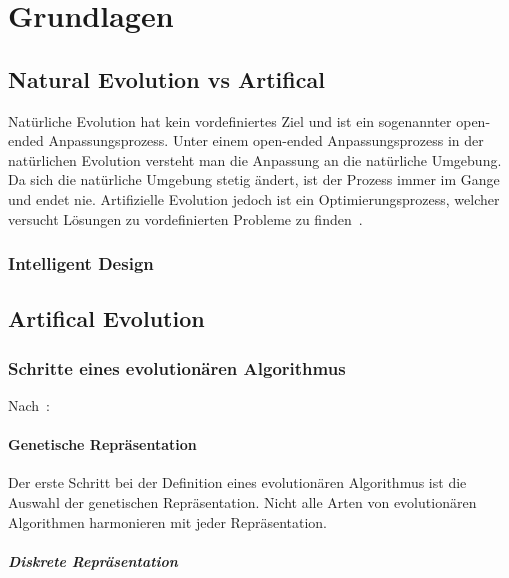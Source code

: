 %
%


\chapter{Grundlagen}

\section{Natural Evolution vs Artifical}

  Natürliche Evolution hat kein vordefiniertes Ziel und ist ein sogenannter open-ended Anpassungsprozess.
  Unter einem open-ended Anpassungsprozess in der natürlichen Evolution versteht man die Anpassung an die natürliche Umgebung.
  Da sich die natürliche Umgebung stetig ändert, ist der Prozess immer im Gange und endet nie.
  Artifizielle Evolution jedoch ist ein Optimierungsprozess,
  welcher versucht Lösungen zu vordefinierten Probleme zu finden~\cite[S.1]{book:bioInspired}.

  \subsection{Intelligent Design\label{sub:IntelligentDesign}}


\section{Artifical Evolution}

  \subsection{Schritte eines evolutionären Algorithmus\label{sub:stepsEvAlgo}}

    Nach~\cite[S.16 - 29]{book:bioInspired}:
    \\

    \subsubsection{Genetische Repräsentation}

    Der erste Schritt bei der Definition eines evolutionären Algorithmus ist die Auswahl der genetischen Repräsentation.
    Nicht alle Arten von evolutionären Algorithmen harmonieren mit jeder Repräsentation.

      \paragraph{Diskrete Repräsentation\label{par:GeneticRepresentationDiscrete}}

